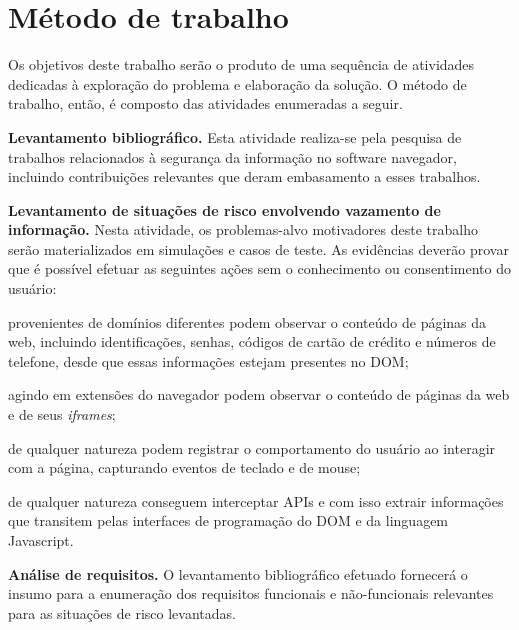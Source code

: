\section{Método de trabalho}


Os objetivos deste trabalho serão o produto de uma sequência de atividades dedicadas à exploração do problema e elaboração da solução. O método de trabalho, então, é composto das atividades enumeradas a seguir.


\begin{alineas}
	\item \textbf{Levantamento bibliográfico.}
	Esta atividade realiza-se pela pesquisa de trabalhos relacionados à segurança da informação no software navegador, incluindo contribuições relevantes que deram embasamento a esses trabalhos.
	
	\item \textbf{Levantamento de situações de risco envolvendo vazamento de informação.}
	Nesta atividade, os problemas-alvo motivadores deste trabalho serão materializados em simulações e casos de teste. As evidências deverão provar que é possível efetuar as seguintes ações sem o conhecimento ou consentimento do usuário:
	
	\begin{alineas}
		\item {\scripts} provenientes de domínios diferentes podem observar o conteúdo de páginas da web, incluindo identificações, senhas, códigos de cartão de crédito e números de telefone, desde que essas informações estejam presentes no DOM;
		\item {\scripts} agindo em extensões do navegador podem observar o conteúdo de páginas da web e de seus \textit{iframes};
		\item {\scripts} de qualquer natureza podem registrar o comportamento do usuário ao interagir com a página, capturando eventos de teclado e de mouse;
		\item {\scripts} de qualquer natureza conseguem interceptar APIs e com isso extrair informações que transitem pelas interfaces de programação do DOM e da linguagem Javascript.
	\end{alineas}

	\item \textbf{Análise de requisitos.}
	O levantamento bibliográfico efetuado fornecerá o insumo para a enumeração dos requisitos funcionais e não-funcionais relevantes para as situações de risco levantadas.
	

\end{alineas}
